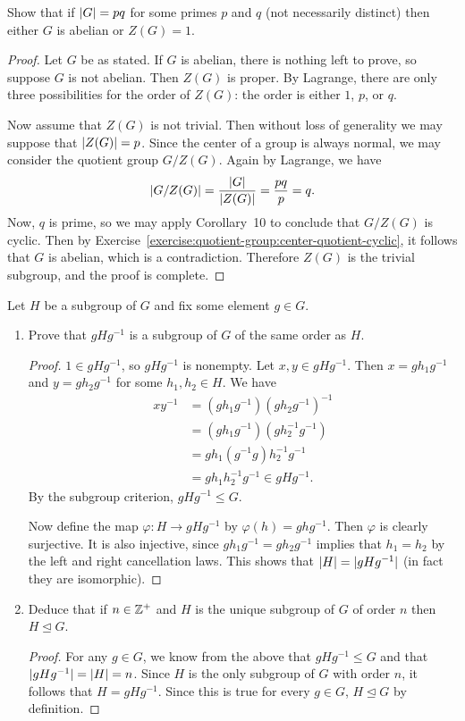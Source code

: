  Show that if $\lvert{G}\rvert = pq$ for some primes $p$ and $q$
(not necessarily distinct) then either $G$ is abelian or $Z(G) = 1$.
\begin{proof}
  Let $G$ be as stated. If $G$ is abelian, there is nothing left to
  prove, so suppose $G$ is not abelian. Then $Z(G)$ is proper. By
  Lagrange, there are only three possibilities for the order of
  $Z(G)$: the order is either $1$, $p$, or $q$.

  Now assume that $Z(G)$ is not trivial. Then without loss of
  generality we may suppose that $\lvert{Z(G)}\rvert = p$. Since the center of
  a group is always normal, we may consider the quotient group
  $G/Z(G)$. Again by Lagrange, we have
  \begin{equation*}
    \lvert{G/Z(G)}\rvert = \frac{\lvert{G}\rvert}{\lvert{Z(G)}\rvert} = \frac{pq}p = q.
  \end{equation*}
  Now, $q$ is prime, so we may apply Corollary~10 to conclude that
  $G/Z(G)$ is cyclic. Then by
  Exercise~\ref{exercise:quotient-group:center-quotient-cyclic}, it
  follows that $G$ is abelian, which is a contradiction. Therefore
  $Z(G)$ is the trivial subgroup, and the proof is complete.
\end{proof}

 Let $H$ be a subgroup of $G$ and fix some element $g\in G$.
\begin{enumerate}
\item Prove that $gHg^{-1}$ is a subgroup of $G$ of the same order as
  $H$.
  \begin{proof}
    $1\in gHg^{-1}$, so $gHg^{-1}$ is nonempty. Let
    $x,y\in gHg^{-1}$. Then $x = gh_1g^{-1}$ and $y = gh_2g^{-1}$
    for some $h_1,h_2\in H$. We have
    \begin{align*}
      xy^{-1} &= (gh_1g^{-1})(gh_2g^{-1})^{-1} \\
              &= (gh_1g^{-1})(gh_2^{-1}g^{-1}) \\
              &= gh_1(g^{-1}g)h_2^{-1}g^{-1} \\
              &= gh_1h_2^{-1}g^{-1} \in gHg^{-1}.
    \end{align*}
    By the subgroup criterion, $gHg^{-1}\leq G$.

    Now define the map $\varphi\colon H\to gHg^{-1}$ by
    $\varphi(h) = ghg^{-1}$. Then $\varphi$ is clearly surjective. It
    is also injective, since $gh_1g^{-1} = gh_2g^{-1}$ implies that
    $h_1 = h_2$ by the left and right cancellation laws. This shows
    that $\lvert{H}\rvert = \lvert{gHg^{-1}}\rvert$ (in fact they are isomorphic).
  \end{proof}
\item Deduce that if $n\in\mathbb{Z}^+$ and $H$ is the unique subgroup of $G$
  of order $n$ then $H\trianglelefteq G$.
  \begin{proof}
    For any $g\in G$, we know from the above that $gHg^{-1}\leq G$ and
    that $\lvert{gHg^{-1}}\rvert = \lvert{H}\rvert = n$. Since $H$ is the only
    subgroup of $G$ with order $n$, it follows that $H =
    gHg^{-1}$. Since this is true for every $g\in G$,
    $H\trianglelefteq G$ by definition.
  \end{proof}
\end{enumerate}


